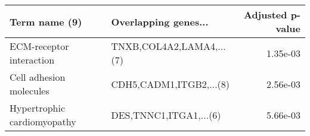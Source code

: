\begin{tabular}{llr}
\toprule
              Term name (9) &     Overlapping genes... &  Adjusted p-value \\
\midrule
   ECM-receptor interaction & TNXB,COL4A2,LAMA4,...(7) &          1.35e-03 \\
    Cell adhesion molecules &  CDH5,CADM1,ITGB2,...(8) &          2.56e-03 \\
Hypertrophic cardiomyopathy &   DES,TNNC1,ITGA1,...(6) &          5.66e-03 \\
\bottomrule
\end{tabular}
